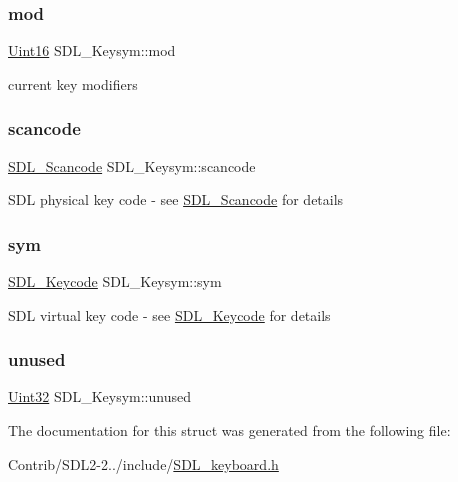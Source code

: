 \subsubsection{\texorpdfstring{mod}{mod}}
{\footnotesize\ttfamily \mbox{\hyperlink{_s_d_l__stdinc_8h_a31fcc0a076c9068668173ee26d33e42b}{Uint16}} S\+D\+L\+\_\+\+Keysym\+::mod}

current key modifiers \mbox{\label{struct_s_d_l___keysym_ad47e9120a511e2efc7ec0c6d8a5ec51e}} 
\subsubsection{\texorpdfstring{scancode}{scancode}}
{\footnotesize\ttfamily \mbox{\hyperlink{_s_d_l__scancode_8h_a82ab7cff701034fb40a47b5b3a02777b}{S\+D\+L\+\_\+\+Scancode}} S\+D\+L\+\_\+\+Keysym\+::scancode}

S\+DL physical key code -\/ see \mbox{\hyperlink{_s_d_l__scancode_8h_a82ab7cff701034fb40a47b5b3a02777b}{S\+D\+L\+\_\+\+Scancode}} for details \mbox{\label{struct_s_d_l___keysym_a082ff1fd787b79fa6c3a445deb225f08}} 
\subsubsection{\texorpdfstring{sym}{sym}}
{\footnotesize\ttfamily \mbox{\hyperlink{_s_d_l__keycode_8h_ae9265f064f13f0f74dfca26a67875171}{S\+D\+L\+\_\+\+Keycode}} S\+D\+L\+\_\+\+Keysym\+::sym}

S\+DL virtual key code -\/ see \mbox{\hyperlink{_s_d_l__keycode_8h_ae9265f064f13f0f74dfca26a67875171}{S\+D\+L\+\_\+\+Keycode}} for details \mbox{\label{struct_s_d_l___keysym_ab1d0a50cc619966fb06b92e15cc46dd9}} 
\subsubsection{\texorpdfstring{unused}{unused}}
{\footnotesize\ttfamily \mbox{\hyperlink{_s_d_l__stdinc_8h_add440eff171ea5f55cb00c4a9ab8672d}{Uint32}} S\+D\+L\+\_\+\+Keysym\+::unused}



The documentation for this struct was generated from the following file\+:\begin{DoxyCompactItemize}
\item 
Contrib/\+S\+D\+L2-\/2../include/\mbox{\hyperlink{_s_d_l__keyboard_8h}{S\+D\+L\+\_\+keyboard.\+h}}\end{DoxyCompactItemize}
